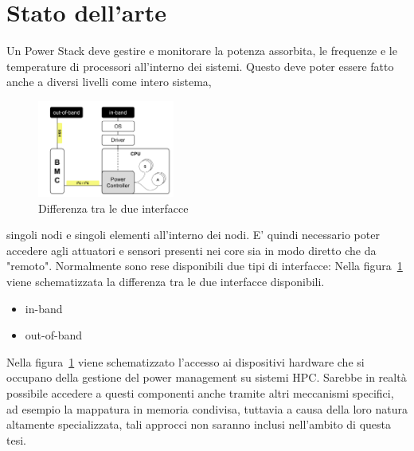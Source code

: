 \section{Stato dell'arte}
Un Power Stack deve gestire e monitorare la potenza assorbita, le frequenze e le temperature di processori all'interno dei sistemi. Questo deve poter essere fatto anche a diversi livelli come intero sistema,
\setlength{\intextsep}{1pt} %
\begin{figure}
    \includegraphics[width=0.4\textwidth]{img/SoA.png}
    \centering
    \caption{Differenza tra le due interfacce} 
    \label{fig:SoAinoutband}
\end{figure}
singoli nodi e singoli elementi all'interno dei nodi. E' quindi necessario poter accedere agli attuatori e sensori presenti nei core sia in modo diretto che da "remoto". Normalmente sono rese disponibili due tipi di interfacce:
Nella figura~\ref{fig:SoAinoutband} viene schematizzata la differenza tra le due interfacce disponibili. 
\begin{itemize}
    \item in-band
    \item out-of-band
\end{itemize}
Nella figura~\ref{fig:SoAinoutband} viene schematizzato l'accesso ai dispositivi hardware che si occupano della gestione del power management su sistemi HPC. Sarebbe in realtà possibile accedere a questi componenti anche tramite altri meccanismi specifici, ad esempio la mappatura in memoria condivisa, tuttavia a causa della loro natura altamente specializzata, tali approcci non saranno inclusi nell'ambito di questa tesi.


